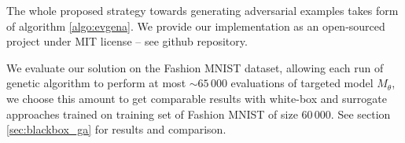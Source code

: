 The whole proposed strategy towards generating adversarial examples takes form of algorithm \ref{algo:evgena}. We provide our implementation as an open-sourced project under MIT license -- see \cite{git_evgena} github repository.

We evaluate our solution on the Fashion MNIST dataset, allowing each run of genetic algorithm to perform at most $\sim 65\,000$ evaluations of targeted model $M_\theta$, we choose this amount to get comparable results with white-box and surrogate approaches trained on training set of Fashion MNIST of size $60\,000$. See section \ref{sec:blackbox_ga} for results and comparison.
